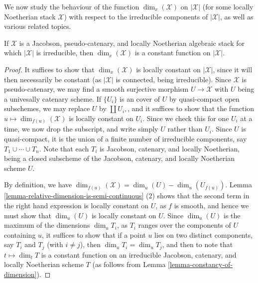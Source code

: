 \noindent
We now study the behaviour of the function $\dim_x(\mathcal{X})$ on
$|\mathcal{X}|$
(for some locally Noetherian stack $\mathcal{X}$) with respect to the
irreducible
components of $|\mathcal{X}|$, as well as various
related topics.

\begin{lemma}
\label{lemma-irreducible-implies-equidimensional}
If $\mathcal{X}$ is
a Jacobson, pseudo-catenary, and locally Noetherian  algebraic stack
for which $|\mathcal{X}|$ is irreducible,
then $\dim_x(\mathcal{X})$ is a constant function on $|\mathcal{X}|$.
\end{lemma}

\begin{proof}
It suffices to show that $\dim_x(\mathcal{X})$ is locally constant on
$|\mathcal{X}|$,
since it will then necessarily be constant (as $|\mathcal{X}|$ is connected,
being irreducible).  Since $\mathcal{X}$ is pseudo-catenary,
we may find a smooth surjective morphism $U \to \mathcal{X}$ with $U$
being a univesally catenary scheme.  If $\{U_i\}$ is an
cover of $U$ by quasi-compact open subschemes, we may replace
$U$ by $\coprod U_i,$, and
it suffices to show that
the function $u \mapsto \dim_{f(u)}(\mathcal{X})$ is locally constant on $U_i$.
Since we check this for one $U_i$ at a time, we now drop the subscript,
and write simply $U$ rather than $U_i$.
Since $U$ is quasi-compact, it
is the union of a finite number of irreducible components,
say $T_1 \cup \cdots \cup T_n$.  Note that each $T_i$ is Jacobson,
catenary, and locally Noetherian,
being a closed subscheme of the Jacobson, catenary, and locally Noetherian
scheme $U$.

\medskip\noindent
By definition, we have
$\dim_{f(u)}(\mathcal{X}) = \dim_{u}(U) - \dim_{u}(U_{f(u)}).$
Lemma \ref{lemma-relative-dimension-is-semi-continuous} (2)
shows that the second term in the right hand expression is locally
constant on $U$, as $f$ is smooth,
and hence we must show that $\dim_u(U)$
is locally constant on $U$.  Since $\dim_u(U)$ is the maximum
of the dimensions $\dim_u T_i$, as $T_i$ ranges over the components
of $U$ containing $u$, it suffices to show
that if a point $u$ lies on two distinct components,
say $T_i$ and $T_j$ (with $i \neq j$),
then $\dim_u T_i = \dim_u T_j$,
and then to note that $t\mapsto \dim_t T$ is a constant
function on an irreducible Jacobson,
catenary, and locally Noetherian scheme $T$
(as follows from Lemma \ref{lemma-constancy-of-dimension}).


\end{proof}
